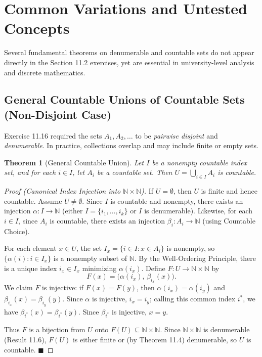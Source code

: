 \documentclass[11pt, letterpaper]{article}
\newtheorem{theorem}{Theorem}[section]
\theoremstyle{definition}
\theoremstyle{remark}
\begin{document}
\section{Common Variations and Untested Concepts}

Several fundamental theorems on denumerable and countable sets do not appear directly in the Section 11.2 exercises, yet are essential in university-level analysis and discrete mathematics.

\subsection{General Countable Unions of Countable Sets (Non-Disjoint Case)}

Exercise 11.16 required the sets $A_1, A_2, \dots$ to be \textit{pairwise disjoint} and \textit{denumerable}. In practice, collections overlap and may include finite or empty sets.

\begin{theorem}[General Countable Union]
Let $I$ be a nonempty countable index set, and for each $i \in I$, let $A_i$ be a countable set. Then $U = \bigcup_{i \in I} A_i$ is countable.
\end{theorem}

\begin{proof}[Proof (Canonical Index Injection into $\mathbb{N} \times \mathbb{N}$)]
If $U = \emptyset$, then $U$ is finite and hence countable. Assume $U \neq \emptyset$. Since $I$ is countable and nonempty, there exists an injection $\alpha : I \to \mathbb{N}$ (either $I = \{i_1, \dots, i_k\}$ or $I$ is denumerable). Likewise, for each $i \in I$, since $A_i$ is countable, there exists an injection $\beta_i : A_i \to \mathbb{N}$ (using Countable Choice).

For each element $x \in U$, the set $I_x = \{i \in I : x \in A_i\}$ is nonempty, so $\{\alpha(i) : i \in I_x\}$ is a nonempty subset of $\mathbb{N}$. By the Well-Ordering Principle, there is a unique index $i_x \in I_x$ minimizing $\alpha(i_x)$. Define $F : U \to \mathbb{N} \times \mathbb{N}$ by
\[
F(x) = \bigl(\alpha(i_x),\, \beta_{i_x}(x)\bigr).
\]
We claim $F$ is injective: if $F(x) = F(y)$, then $\alpha(i_x) = \alpha(i_y)$ and $\beta_{i_x}(x) = \beta_{i_y}(y)$. Since $\alpha$ is injective, $i_x = i_y$; calling this common index $i^*$, we have $\beta_{i^*}(x) = \beta_{i^*}(y)$. Since $\beta_{i^*}$ is injective, $x = y$.

Thus $F$ is a bijection from $U$ onto $F(U) \subseteq \mathbb{N} \times \mathbb{N}$. Since $\mathbb{N} \times \mathbb{N}$ is denumerable (Result 11.6), $F(U)$ is either finite or (by Theorem 11.4) denumerable, so $U$ is countable. $\blacksquare$
\end{proof}
\end{document}
